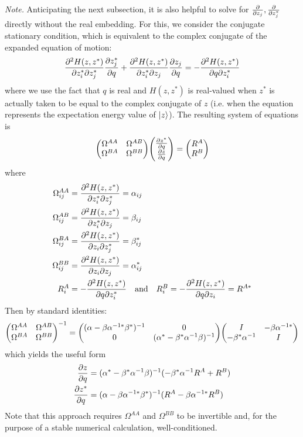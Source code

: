 \documentclass[12pt]{article}
\newcommand{\inv}{^{-1}}
\begin{document}
	\textit{Note.} Anticipating the next subsection, it is also helpful to solve for $\pdv{z_j}, \pdv{z_j^*}$ directly without the real embedding. For this, we consider the conjugate stationary condition, which is equivalent to the complex conjugate of the expanded equation of motion:
	\begin{equation}
	\pdv[2]{H(z, z^*)}{z_i^*}{z_j^*} \pdv{z_j^*}{q} + \pdv[2]{H(z, z^*)}{z_i^*}{z_j} \pdv{z_j}{q} = -\pdv[2]{H(z, z^*)}{q}{z_i^*}
	\end{equation}
	where we use the fact that $q$ is real and $H(z, z^*)$ is real-valued when $z^*$ is actually taken to be equal to the complex conjugate of $z$ (i.e. when the equation represents the expectation energy value of $\ket{z}$). The resulting system of equations is
	\begin{equation}
	\mqty(\Omega^{AA} & \Omega^{AB} \\ \Omega^{BA} & \Omega^{BB}) \mqty(\pdv{z^*}{q} \\ \pdv{z}{q}) = \mqty(R^A \\ R^B)
	\end{equation}
	where
	\begin{align}
	\Omega^{AA}_{ij} &= \pdv[2]{H(z, z^*)}{z_i^*}{z_j^*} = \alpha_{ij}\\
	\Omega^{AB}_{ij} &= \pdv[2]{H(z, z^*)}{z_i^*}{z_j} = \beta_{ij}\\
	\Omega^{BA}_{ij} &= \pdv[2]{H(z, z^*)}{z_i}{z_j^*} = \beta^*_{ij}\\
	\Omega^{BB}_{ij} &= \pdv[2]{H(z, z^*)}{z_i}{z_j} = \alpha^*_{ij}\\
	R^A_i &= -\pdv[2]{H(z, z^*)}{q}{z_i^*} \qq{and} R^B_i = -\pdv[2]{H(z, z^*)}{q}{z_i} = R^{A*}
	\end{align}
	Then by standard identities:
	\begin{equation}
	\mqty(\Omega^{AA} & \Omega^{AB} \\ \Omega^{BA} & \Omega^{BB})\inv = \mqty((\alpha - \beta \alpha^{-1*} \beta^*)\inv & 0 \\ 0 & (\alpha^* - \beta^* \alpha\inv \beta)\inv) \mqty(I & -\beta \alpha^{-1*} \\ -\beta^* \alpha\inv & I)
	\end{equation}
	which yields the useful form
	\begin{align} \label{eq: characteristic trajectories no embedding}
	\pdv{z}{q} &= (\alpha^* - \beta^* \alpha\inv \beta)\inv (-\beta^* \alpha\inv R^A + R^B)\\
	\pdv{z^*}{q} &=  (\alpha - \beta \alpha^{-1*} \beta^*)\inv (R^A - \beta \alpha^{-1*} R^B)
	\end{align}
	Note that this approach requires $\Omega^{AA}$ and $\Omega^{BB}$ to be invertible and, for the purpose of a stable numerical calculation, well-conditioned.
	
\end{document}
